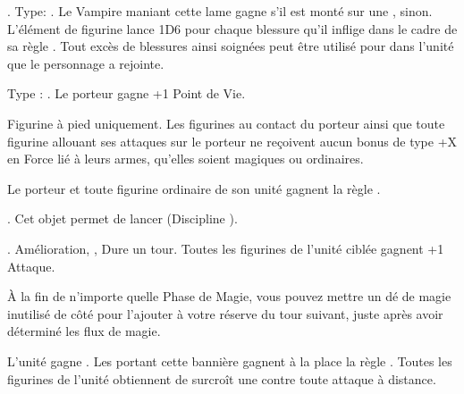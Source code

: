 { . Type: \hw{}. Le Vampire maniant cette lame gagne  s'il est monté sur une \largetarget{},  sinon. L'élément de figurine lance 1D6 pour chaque blessure qu'il inflige dans le cadre de sa règle \vampiric{}. Tout excès de blessures ainsi soignées peut être utilisé pour \raisewounds{} dans l'unité que le personnage a rejointe.

\endpricelist

\armymagicalarmour

\startpricelist

 Type : \platearmour{}. Le porteur gagne +1 Point de Vie.

\endpricelist

\armytalismans

\startpricelist

 Figurine à pied uniquement. Les figurines au contact du porteur ainsi que toute figurine allouant ses attaques sur le porteur ne reçoivent aucun bonus de type +X en Force lié à leurs armes, qu'elles soient magiques ou ordinaires.

\endpricelist

\armyenchanteditems

\startpricelist

 Le porteur et toute figurine ordinaire de son unité gagnent la règle \distracting{}.

\endpricelist

\armyarcaneitems

\startpricelist

 . Cet objet permet de lancer \necromancyspelltwo{} (Discipline \necromancy{}).

 . Amélioration, , Dure un tour. Toutes les figurines de l'unité ciblée gagnent +1 Attaque.

 À la fin de n'importe quelle Phase de Magie, vous pouvez mettre un dé de magie inutilisé de côté pour l'ajouter à votre réserve du tour suivant, juste après avoir déterminé les flux de magie.

\endpricelist

\armymagicalbanners

\startpricelist

 L'unité gagne \bodyguard{\vampirelord{}, \vampirehero{}}. Les \vampireknights{} portant cette bannière gagnent à la place la règle \stubborn{}. Toutes les figurines de l'unité obtiennent de surcroît une  contre toute attaque à distance. 

}
